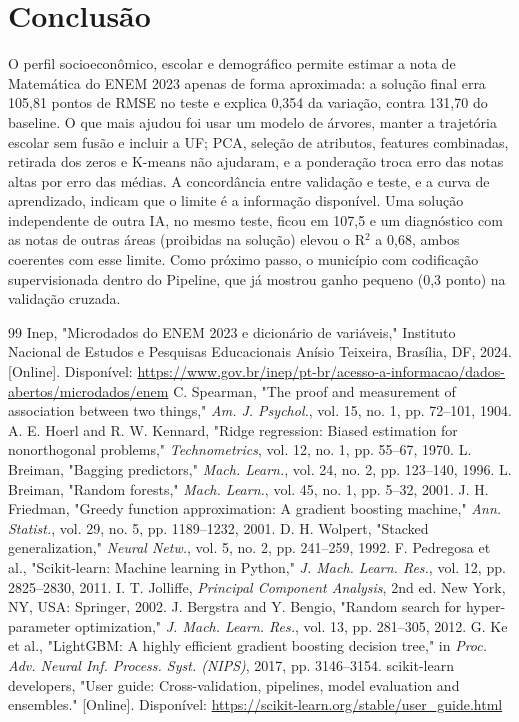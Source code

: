 \documentclass[conference,a4paper]{IEEEtran}
\begin{document}
\section{Conclusão}
O perfil socioeconômico, escolar e demográfico permite estimar a nota de Matemática do ENEM 2023 apenas de forma aproximada: a solução final erra 105,81 pontos de RMSE no teste e explica 0,354 da variação, contra 131,70 do baseline. O que mais ajudou foi usar um modelo de árvores, manter a trajetória escolar sem fusão e incluir a UF; PCA, seleção de atributos, features combinadas, retirada dos zeros e K-means não ajudaram, e a ponderação troca erro das notas altas por erro das médias. A concordância entre validação e teste, e a curva de aprendizado, indicam que o limite é a informação disponível. Uma solução independente de outra IA, no mesmo teste, ficou em 107,5 e um diagnóstico com as notas de outras áreas (proibidas na solução) elevou o R$^2$ a 0,68, ambos coerentes com esse limite. Como próximo passo, o município com codificação supervisionada dentro do Pipeline, que já mostrou ganho pequeno (0,3 ponto) na validação cruzada.


\begin{thebibliography}{99}
 Inep, "Microdados do ENEM 2023 e dicionário de variáveis," Instituto Nacional de Estudos e Pesquisas Educacionais Anísio Teixeira, Brasília, DF, 2024. [Online]. Disponível: \url{https://www.gov.br/inep/pt-br/acesso-a-informacao/dados-abertos/microdados/enem}
 C. Spearman, "The proof and measurement of association between two things," \textit{Am. J. Psychol.}, vol. 15, no. 1, pp. 72--101, 1904.
 A. E. Hoerl and R. W. Kennard, "Ridge regression: Biased estimation for nonorthogonal problems," \textit{Technometrics}, vol. 12, no. 1, pp. 55--67, 1970.
 L. Breiman, "Bagging predictors," \textit{Mach. Learn.}, vol. 24, no. 2, pp. 123--140, 1996.
 L. Breiman, "Random forests," \textit{Mach. Learn.}, vol. 45, no. 1, pp. 5--32, 2001.
 J. H. Friedman, "Greedy function approximation: A gradient boosting machine," \textit{Ann. Statist.}, vol. 29, no. 5, pp. 1189--1232, 2001.
 D. H. Wolpert, "Stacked generalization," \textit{Neural Netw.}, vol. 5, no. 2, pp. 241--259, 1992.
 F. Pedregosa et al., "Scikit-learn: Machine learning in Python," \textit{J. Mach. Learn. Res.}, vol. 12, pp. 2825--2830, 2011.
 I. T. Jolliffe, \textit{Principal Component Analysis}, 2nd ed. New York, NY, USA: Springer, 2002.
 J. Bergstra and Y. Bengio, "Random search for hyper-parameter optimization," \textit{J. Mach. Learn. Res.}, vol. 13, pp. 281--305, 2012.
 G. Ke et al., "LightGBM: A highly efficient gradient boosting decision tree," in \textit{Proc. Adv. Neural Inf. Process. Syst. (NIPS)}, 2017, pp. 3146--3154.
 scikit-learn developers, "User guide: Cross-validation, pipelines, model evaluation and ensembles." [Online]. Disponível: \url{https://scikit-learn.org/stable/user_guide.html}
\end{thebibliography}
\end{document}
